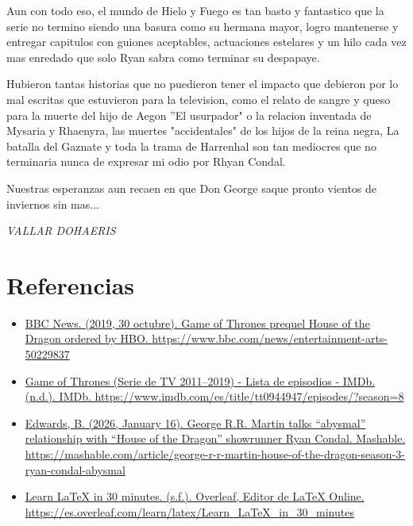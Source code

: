 \documentclass{article}
\begin{document}
Aun con todo eso, el mundo de Hielo y Fuego es tan basto y fantastico que la serie no termino siendo una basura como su hermana mayor, logro mantenerse y entregar capitulos con guiones aceptables, actuaciones estelares y un hilo cada vez mas enredado que solo Ryan sabra como terminar su despapaye.\vspace{\baselineskip}

Hubieron tantas historias que no puedieron tener el impacto que debieron por lo mal escritas que estuvieron para la television, como el relato de sangre y queso para la muerte del hijo de Aegon ''El usurpador"  o la relacion inventada de Mysaria y Rhaenyra, las muertes "accidentales" de los hijos de la reina negra, La batalla del Gaznate y toda la trama de Harrenhal son tan mediocres que no terminaria nunca de expresar mi odio por Rhyan Condal. \vspace{\baselineskip}

Nuestras esperanzas aun recaen en que Don George saque pronto vientos de inviernos sin mas... \vspace{\baselineskip}

\textit{VALLAR DOHAERIS}

\section{Referencias}
\begin{itemize}
  \item \href{https://www.bbc.com/news/entertainment-arts-50229837}{BBC News. (2019, 30 octubre). Game of Thrones prequel House of the Dragon ordered by HBO. https://www.bbc.com/news/entertainment-arts-50229837}
  \item \href{https://www.imdb.com/es/title/tt0944947/episodes/?season=8}{Game of Thrones (Serie de TV 2011–2019) - Lista de episodios - IMDb. (n.d.). IMDb. https://www.imdb.com/es/title/tt0944947/episodes/?season=8}
  \item \href{https://mashable.com/article/george-r-r-martin-house-of-the-dragon-season-3-ryan-condal-abysmal}{Edwards, B. (2026, January 16). George R.R. Martin talks “abysmal” relationship with “House of the Dragon” showrunner Ryan Condal. Mashable. https://mashable.com/article/george-r-r-martin-house-of-the-dragon-season-3-ryan-condal-abysmal}
  \item \href{https://es.overleaf.com/learn/latex/Learn_LaTeX_in_30_minutes}{Learn LaTeX in 30 minutes. (s.f.). Overleaf, Editor de LaTeX Online. https://es.overleaf.com/learn/latex/Learn\_LaTeX\_in\_30\_minutes}
\end{itemize}
\end{document}
